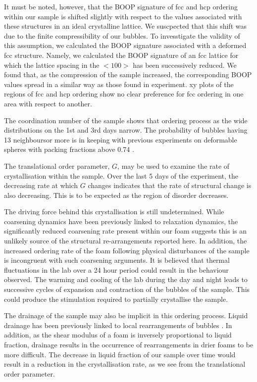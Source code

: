 \documentclass[10pt,a4paper]{article}
\begin{document}
It must be noted, however, that the BOOP signature of fcc and hcp ordering within our sample is shifted slightly with respect to the values associated with these structures in an ideal crystalline lattice. We suscpected that this shift was due to the finite compressibility of our bubbles. To invesstigate the validity of this assumption, we calculated the BOOP signature associated with a deformed fcc structure. Namely, we calculated the BOOP signature of an fcc lattice for which the lattice spacing in the $< 100 >$ has been successively reduced. 
We found that, as the compression of the sample increased, the corresponding BOOP values spread in a similar way as those found in experiment. xy plots of the regions of fcc and hcp ordering show no clear preference for fcc ordering in one area with respect to another. 

The coordination number of the sample shows that ordering process as the wide distributions on the 1st and 3rd days narrow. The probability of bubbles having 13 neighboursor more is in keeping with previous experiments on deformable spheres with packing fractions above 0.74 \cite{PhysRevE.84.011302}.

The translational order parameter, $G$, may be used to examine the rate of crystallisation within the sample. Over the last 5 days of the experiment, the decreasing rate at which $G$ changes indicates that the rate of structural change is also decreasing. This is to be expected as the region of disorder decreases.

The driving force behind this crystallisation is still undetermined. While coarsening dynamics have been previously linked to relaxation dynamics, the significantly reduced coarsening rate present within our foam suggests this is an unlikely source of the structural re-arrangements reported here. In addition, the increased ordering rate of the foam following physical disturbances of the sample is incongruent with such coarsening arguments. It is believed that thermal fluctuations in the lab over a 24 hour period could result in the behaviour observed. The warming and cooling of the lab during the day and night leads to successive cycles of expansion and contraction of the bubbles of the sample. This could produce the stimulation required to partially crystallise the sample.

The drainage of the sample may also be implicit in this ordering process. Liquid drainage has been previously linked to local rearrangements of  bubbles \cite{Carrier2003,PhysRevLett.91.188303}. In addition, as the shear modulus of a foam is inversely proportional to liquid fraction, drainage results in the occurrence of rearrangements in drier foams to be more difficult. The decrease in liquid fraction of our sample over time would result in a reduction in the crystallisation rate, as we see from the translational order parameter. 
\end{document}
